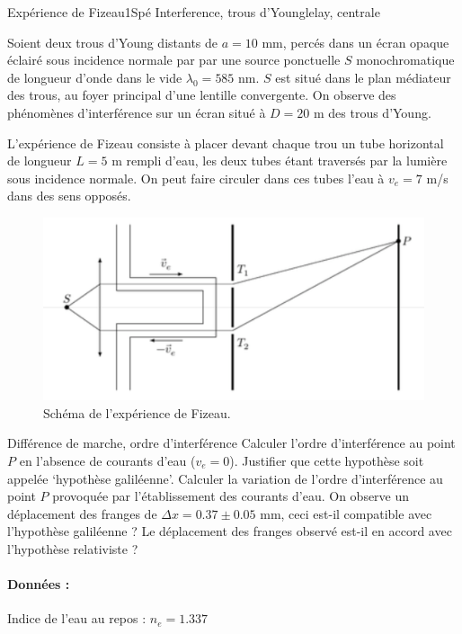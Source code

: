 \begin{exercise}{Expérience de Fizeau}{1}{Spé}
{Interference, trous d'Young}{lelay, centrale}

Soient deux trous d'Young distants de $a = 10$ mm, percés dans un écran opaque éclairé sous incidence normale par par une source ponctuelle $S$ monochromatique de longueur d'onde dans le vide $\lambda_0 = 585$ nm. $S$ est situé dans le plan médiateur des trous, au foyer principal d'une lentille convergente. On observe des phénomènes d'interférence sur un écran situé à $D = 20$ m des trous d'Young.

L'expérience de Fizeau consiste à placer devant chaque trou un tube horizontal de longueur $L = 5$ m rempli d'eau, les deux tubes étant traversés par la lumière sous incidence normale. On peut faire circuler dans ces tubes l'eau à $v_e = 7$ m/s dans des sens opposés.

\begin{figure}[H]
    \centering
    \includegraphics[width=.8\linewidth]{optique/interferences/expfizo.png}
    \caption{Schéma de l'expérience de Fizeau.}
\end{figure}

\begin{questions}
    \questioncours Différence de marche, ordre d'interférence
    \question Calculer l'ordre d'interférence au point $P$ en l'absence de courants d'eau ($v_e =0$).
    \question Justifier que cette hypothèse soit appelée `hypothèse galiléenne'.
    \question Calculer la variation de l'ordre d'interférence au point $P$ provoquée par l'établissement des courants d'eau.
    \question On observe un déplacement des franges de $\Delta x = 0.37 \pm 0.05$ mm, ceci est-il compatible avec l'hypothèse galiléenne ?
    \question Le déplacement des franges observé est-il en accord avec l'hypothèse relativiste ?
\end{questions}


\paragraph{Données :} Indice de l'eau au repos : $n_e = 1.337$

\end{exercise}